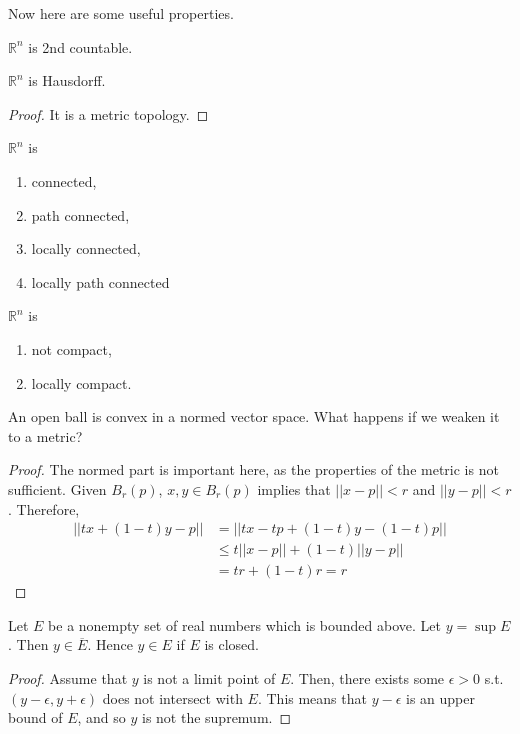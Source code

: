  Now here are some useful properties. 

  \begin{theorem}[Countability]
    $\mathbb{R}^n$ is 2nd countable. 
  \end{theorem}

  \begin{theorem}[Separability]
    $\mathbb{R}^n$ is Hausdorff. 
  \end{theorem}
  \begin{proof}
    It is a metric topology. 
  \end{proof}

  \begin{theorem}[Connectedness]
    $\mathbb{R}^n$ is 
    \begin{enumerate}
      \item connected, 
      \item path connected, 
      \item locally connected, 
      \item locally path connected
    \end{enumerate}
  \end{theorem}

  \begin{theorem}[Compactness]
    $\mathbb{R}^n$ is 
    \begin{enumerate}
      \item not compact, 
      \item locally compact. 
    \end{enumerate}
  \end{theorem}

  \begin{theorem}[Convexity]
    An open ball is convex in a normed vector space. What happens if we weaken it to a metric? 
  \end{theorem}
  \begin{proof}
    The normed part is important here, as the properties of the metric is not sufficient. Given $B_r (p)$, $x, y \in B_r (p)$ implies that $||x - p|| < r$ and $||y - p ||<r$. Therefore, 
    \begin{align}
      ||t x + (1 - t)y - p|| & = ||t x - tp + (1 - t) y - (1 - t) p|| \\
      & \leq t ||x - p|| + (1 - t) ||y - p|| \\
      & = t r + (1 - t) r = r 
    \end{align}
  \end{proof}

  \begin{theorem}
    Let $E$ be a nonempty set of real numbers which is bounded above. Let $y = \sup{E}$. Then $y \in \overline{E}$. Hence $y \in E$ if $E$ is closed. 
  \end{theorem}
  \begin{proof}
    Assume that $y$ is not a limit point of $E$. Then, there exists some $\epsilon > 0$ s.t. $(y - \epsilon, y + \epsilon)$ does not intersect with $E$. This means that $y - \epsilon$ is an upper bound of $E$, and so $y$ is not the supremum. 
  \end{proof}

